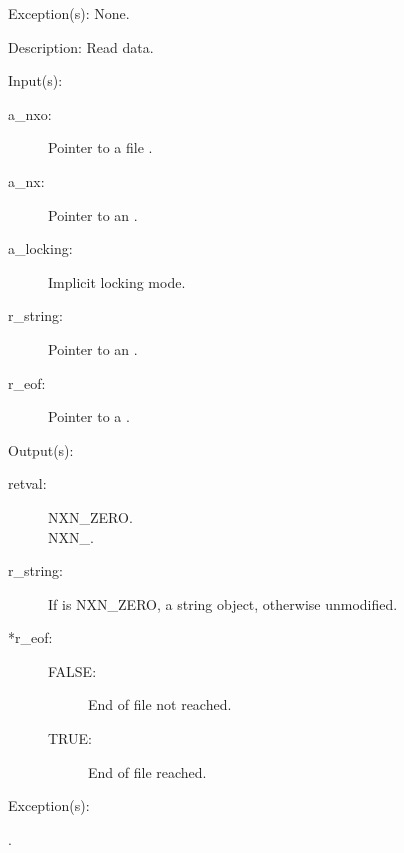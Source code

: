 \begin{capi}
\begin{capilist}
\begin{description}
		\end{description}
	\item[Exception(s): ] None.
	\item[Description: ]
		Read data.
	\end{capilist}
\label{nxo_file_readline}
	\begin{capilist}
	\item[Input(s): ]
		\begin{description}\item[]
		\item[a\_nxo: ]
			Pointer to a file .
		\item[a\_nx: ]
			Pointer to an .
		\item[a\_locking: ]
			Implicit locking mode.
		\item[r\_string: ]
			Pointer to an .
		\item[r\_eof: ]
			Pointer to a .
		\end{description}
	\item[Output(s): ]
		\begin{description}\item[]
		\item[retval: ]
			\begin{description}\item[]
			\item[NXN\_ZERO.]
			\item[NXN\_.]
			\end{description}
		\item[r\_string: ]
			If  is NXN\_ZERO, a string object,
			otherwise unmodified.
		\item[*r\_eof: ]
			\begin{description}\item[]
			\item[FALSE: ]
				End of file not reached.
			\item[TRUE: ]
				End of file reached.
			\end{description}
		\end{description}
	\item[Exception(s): ]
		\begin{description}\item[]
		\item[.]

\end{description}
\end{capilist}
\end{capi}
